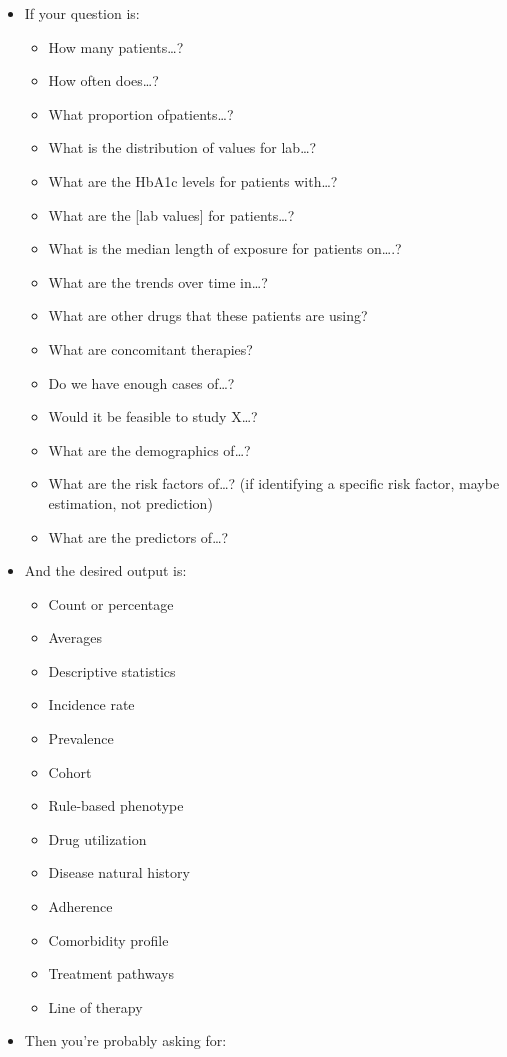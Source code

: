 \documentclass[11pt]{book}
\providecommand{\tightlist}{%
  \setlength{\itemsep}{0pt}\setlength{\parskip}{0pt}}
\theoremstyle{definition}
\theoremstyle{definition}
\theoremstyle{definition}
\theoremstyle{remark}
\begin{document}
\begin{itemize}
\tightlist
\item
  If your question is:

  \begin{itemize}
  \tightlist
  \item
    How many patients\ldots?
  \item
    How often does\ldots?
  \item
    What proportion ofpatients\ldots?
  \item
    What is the distribution of values for lab\ldots?
  \item
    What are the HbA1c levels for patients with\ldots?
  \item
    What are the {[}lab values{]} for patients\ldots?
  \item
    What is the median length of exposure for patients on\ldots.?
  \item
    What are the trends over time in\ldots?
  \item
    What are other drugs that these patients are using?
  \item
    What are concomitant therapies?
  \item
    Do we have enough cases of\ldots?
  \item
    Would it be feasible to study X\ldots?
  \item
    What are the demographics of\ldots?
  \item
    What are the risk factors of\ldots? (if identifying a specific risk factor, maybe estimation, not prediction)
  \item
    What are the predictors of\ldots?
  \end{itemize}
\item
  And the desired output is:

  \begin{itemize}
  \tightlist
  \item
    Count or percentage
  \item
    Averages
  \item
    Descriptive statistics
  \item
    Incidence rate
  \item
    Prevalence
  \item
    Cohort
  \item
    Rule-based phenotype
  \item
    Drug utilization
  \item
    Disease natural history
  \item
    Adherence
  \item
    Comorbidity profile
  \item
    Treatment pathways
  \item
    Line of therapy
  \end{itemize}
\item
  Then you're probably asking for:


\end{itemize}
\end{document}
